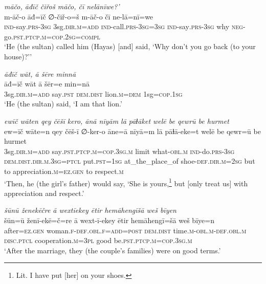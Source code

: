 \ea \label{ŽH.112}
\textit{māčo, āđīč čiřoš māčo, čī nelānīwe?’} \\ 
\gll m-āč-o āđ=īč ∅-čiř-o=š m-āč-o čī ne-lā=nī=we \\ 
 \textsc{ind-}say\textsc{.prs}\textsc{-3sg} 3sg\textsc{.dir}\textsc{.m}\textsc{=add} \textsc{ind-}call\textsc{.prs}\textsc{-3sg}\textsc{=3sg} \textsc{ind-}say\textsc{.prs}\textsc{-3sg} why \textsc{neg-}go\textsc{.pst}\textsc{.ptcp}\textsc{.m}\textsc{=cop}\textsc{.\textsc{2sg}}\textsc{=compl} \\ 
\glt `He (the sultan) called him (Hayas) [and] said, ‘Why don’t you go back (to your house)?’'
\z 
 
\ea \label{ŽH.116}
\textit{āđīč wāt, ā šēre minnā} \\ 
\gll āđ=īč wāt ā šēr=e min=nā \\ 
 3sg\textsc{.dir}\textsc{.m}\textsc{=add} say\textsc{.pst} \textsc{dem.dist} lion\textsc{.m}\textsc{=dem} 1sg\textsc{=cop}\textsc{.1sg} \\ 
\glt `He (the sultan) said, ‘I am that lion.'
\z 
 
\ea \label{RE.10}
\textit{ewīč wāten qey čēšī kero, ānā nīyām lā pāɫāket welē be qewrū be hurmet} \\ 
\gll ew=īč wāte=n qey čēš-ī ∅-ker-o āne=ā nīyā=m lā pāɫā-eke=t welē be qewr=ū be hurmet \\ 
 3sg\textsc{.dir}\textsc{.m}\textsc{=add} say\textsc{.pst}\textsc{.ptcp}\textsc{.m}\textsc{=cop}\textsc{.3sg}\textsc{.m} limit what\textsc{-obl}\textsc{.m} \textsc{ind-}do\textsc{.prs}\textsc{-3sg} \textsc{dem.dist}\textsc{.dir}\textsc{.m}\textsc{.3sg}=\textsc{ptcl} put\textsc{.pst}\textsc{=\textsc{1sg}} at\_the\_place\_of shoe\textsc{-def}\textsc{.dir}\textsc{.m}\textsc{=\textsc{2sg}} but to appreciation\textsc{.m}\textsc{\textsc{=ez.gen}} to respect\textsc{.m} \\ 
\glt `Then, he (the girl’s father) would say, ‘She is yours,\footnote{Lit. I have put [her] on your shoes.} but [only treat us] with appreciation and respect.'
\z 
 
\ea \label{RE.22}
\textit{šūnū ženekēčre ā wextīekey ētir hemāhengīšā weš bīyen} \\ 
\gll šūn=ū ženī-ekē=č=re ā wext-ī-ekey ētir hemāhengī=šā weš bīye=n \\ 
 after\textsc{=ez.gen} woman\textsc{.f}\textsc{-def}\textsc{.obl}\textsc{.f}\textsc{=add}\textsc{=\textsc{post}} \textsc{dem.dist} time\textsc{.m}\textsc{-obl}\textsc{.m}\textsc{-def}\textsc{.obl}\textsc{.m} \textsc{disc.ptcl} cooperation\textsc{.m}\textsc{=3pl} good be\textsc{.pst}\textsc{.ptcp}\textsc{.m}\textsc{=cop}\textsc{.3sg}\textsc{.m} \\ 
\glt `After the marriage, they (the couple's families) were on good terms.'
\z 
 
